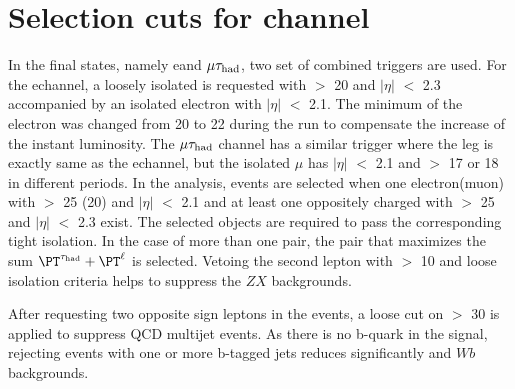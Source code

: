 \section{\texorpdfstring{Selection cuts for \leptonTau channel}{Selection cuts for lepton-tau channel}}
\label{sect:eleTauCuts}
In the \leptonTau final states, namely e\Tau and $\mu\tau_{\rm had}$,
two set of combined triggers are used. For the e\Tau channel, a loosely isolated \Tau is requested with \PT $>$ 20 \GeV and $|\eta|$ $<$ 2.3 
accompanied by an isolated electron with $|\eta|$ $<$ 2.1. The minimum \PT of the electron was changed from  20 to  22 \GeV 
during the run to compensate the increase of the instant luminosity.
The $\mu\tau_{\rm had}$ channel has a similar trigger where the \Tau leg is exactly same as the e\Tau channel, but the  isolated $\mu$  
has $|\eta|$ $<$ 2.1 and \PT $>$  17 or 18 \GeV in different periods. 
In the analysis, events are selected when one electron(muon) with \PT $>$ 25 (20) \GeV and $|\eta|$ $<$ 2.1 and at least 
one oppositely charged \Tau with \PT $>$ 25 \GeV and $|\eta|$ $<$ 2.3 exist. %
The selected objects are required to pass the corresponding tight isolation.
In the case of more than one pair, the pair that maximizes the sum $\PT^{\Tau} + \PT^{\ell}$ is selected.
Vetoing the second lepton with \PT $>$ 10 \GeV and loose isolation criteria helps to suppress the $ZX$ backgrounds.

After requesting two opposite sign leptons in the events, a loose cut on \MET $>$ 30 \GeV is applied to suppress QCD multijet events. 
As there is no b-quark in the signal, rejecting events with one or more b-tagged jets reduces significantly \ttbar and $Wb$ backgrounds.

